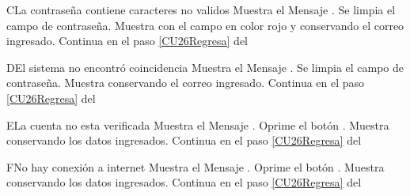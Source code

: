 \begin{UCtrayectoriaA}{C}{La contraseña contiene caracteres no validos}
    \UCpaso Muestra el Mensaje \textbf{}.
    \UCpaso Se limpia el campo de contraseña.
    \UCpaso Muestra  con el campo en color rojo y conservando el correo ingresado.
	\UCpaso Continua en el paso \ref{CU26Regresa} del 
\end{UCtrayectoriaA}

\begin{UCtrayectoriaA}{D}{El sistema no encontró coincidencia}
    \UCpaso Muestra el Mensaje \textbf{}.
    \UCpaso Se limpia el campo de contraseña.
    \UCpaso Muestra  conservando el correo ingresado.
	\UCpaso Continua en el paso \ref{CU26Regresa} del 
\end{UCtrayectoriaA}

\begin{UCtrayectoriaA}{E}{La cuenta no esta verificada}
    \UCpaso Muestra el Mensaje \textbf{}.
    \UCpaso[\UCactor] Oprime el botón .
    \UCpaso Muestra  conservando los datos ingresados.
	\UCpaso Continua en el paso \ref{CU26Regresa} del 
\end{UCtrayectoriaA}

\begin{UCtrayectoriaA}{F}{No hay conexión a internet}
    \UCpaso Muestra el Mensaje \textbf{}.
    \UCpaso[\UCactor] Oprime el botón .
    \UCpaso Muestra  conservando los datos ingresados.
    \UCpaso Continua en el paso \ref{CU26Regresa} del 
\end{UCtrayectoriaA}
		
